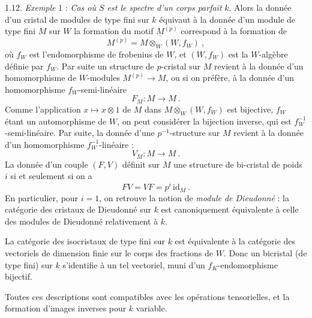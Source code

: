 \documentclass[11pt,a4paper]{article}
\begin{document}
1.12. \emph{Exemple} 1 : \emph{Cas où $S$ est le spectre d'un corps parfait}
$k$. Alors la donnée d'un cristal de modules de type fini sur $k$ équivaut à la
donnée d'un module de type fini $M$ sur $W$\add{,} la formation du motif
$\underline{M}^{(p)}$ correspond à la formation de
\[
  M^{(p)}=M\otimes_W(W,f_W)\ ,
\]
où $f_W$ est l'endomorphisme de frobenius de $W$, et $(W,f_W)$ est la
$W$-algèbre définie par $f_W$. Par suite un structure de $p$-cristal sur $M$
revient à la donnée d'un homomorphisme de $W$-modules $M^{(p)}\to M$, ou si on
préfère, à la donnée d'un homomorphisme $f_W$-semi-linéaire
\[
  F_M\colon M\longrightarrow M\ .
\]
Comme l'application $x\mapsto x\otimes 1$ de $M$ dans $M\otimes_W(W,f_W)$ est
bijective, $f_W$ étant un automorphisme de $W$, on peut considérer la bijection
inverse, qui est $f_W^{-1}$-semi-linéaire. Par suite, la donnée d'une
$p^{-1}$-structure sur $M$ revient à la donnée d'un homomorphisme
$f_W^{-1}$-linéaire :
\[
  V_M\colon M\longrightarrow M\ .
\]
La donnée d'un couple $(F,V)$ définit sur $M$ une structure de bi-cristal de
poids $i$ si et seulement si on a
\[
  FV=VF=p^i\,\mathrm{id}_M\ .
\]
En particulier, pour $i=1$, on retrouve la notion de \emph{module de
Dieudonné} : la catégorie des cristaux de Dieudonné sur $k$ est canoniquement
équivalente à celle des modules de Dieudonné relativement à $k$.

La catégorie des isocristaux de type fini sur $k$ est équivalente à la
catégorie des vectoriels de dimension finie sur le corps des fractions
 \struck{\ill{}} de $W$. Donc un bicristal (de type fini) sur
$k$ s'identifie à un tel vectoriel, muni d'un $f_K$-endomorphisme
bijectif.

Toutes ces descriptions sont compatibles avec les opérations tensorielles, et
la formation d'images inverses pour $k$ variable.
\end{document}
